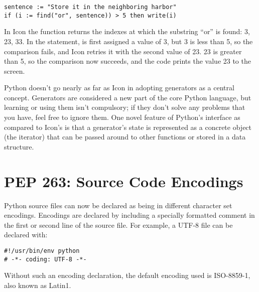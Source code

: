 \documentclass{howto}
\begin{document}
\begin{verbatim}
sentence := "Store it in the neighboring harbor"
if (i := find("or", sentence)) > 5 then write(i)
\end{verbatim}

In Icon the  function returns the indexes at which the
substring ``or'' is found: 3, 23, 33.  In the  statement,
 is first assigned a value of 3, but 3 is less than 5, so the
comparison fails, and Icon retries it with the second value of 23.  23
is greater than 5, so the comparison now succeeds, and the code prints
the value 23 to the screen.

Python doesn't go nearly as far as Icon in adopting generators as a
central concept.  Generators are considered a new part of the core
Python language, but learning or using them isn't compulsory; if they
don't solve any problems that you have, feel free to ignore them.
One novel feature of Python's interface as compared to
Icon's is that a generator's state is represented as a concrete object
(the iterator) that can be passed around to other functions or stored
in a data structure.

\begin{seealso}


\end{seealso}


\section{PEP 263: Source Code Encodings \label{section-encodings}}

Python source files can now be declared as being in different
character set encodings.  Encodings are declared by including a
specially formatted comment in the first or second line of the source
file.  For example, a UTF-8 file can be declared with:

\begin{verbatim}
#!/usr/bin/env python
# -*- coding: UTF-8 -*-
\end{verbatim}

Without such an encoding declaration, the default encoding used is
ISO-8859-1, also known as Latin1.  
\end{document}
